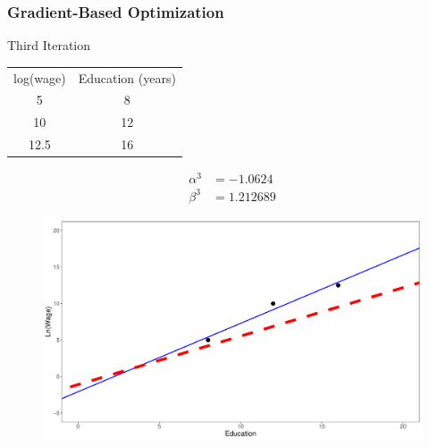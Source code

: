 \documentclass[
  shownotes,
  xcolor={svgnames},
  hyperref={colorlinks,citecolor=DarkBlue,linkcolor=DarkRed,urlcolor=DarkBlue}
  , aspectratio=169]{beamer}
\begin{document}
\begin{frame}[fragile]
\frametitle{Gradient-Based Optimization}
\tiny
Third Iteration
\begin{table}[]
\begin{tabular}{cc}
log(wage) & Education (years) \\
5         & 8                                                         \\
10        & 12                                                          \\
12.5      & 16                                                          \\
\end{tabular}
\end{table}



\begin{align}
\alpha^3&= -1.0624 \nonumber \\
\beta^3 &= 1.212689 \nonumber
\end{align}





    
        \begin{figure}[H] \centering
            \captionsetup{justification=centering}  
            \includegraphics[scale=0.15]{figures/fig_1_4.pdf}
    \end{figure}


\end{frame}
\end{document}
